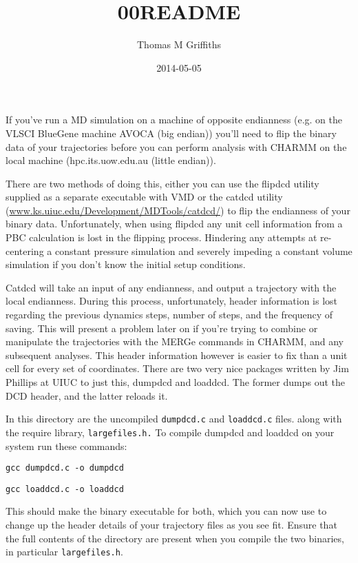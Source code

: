 \documentclass[11pt,a4paper]{article}
\title{00README}
\author{Thomas M Griffiths}
\date{2014-05-05}
\begin{document}
    \maketitle
    If you've run a MD simulation on a machine of opposite endianness 
    (e.g. on the VLSCI BlueGene machine AVOCA (big endian)) you'll need 
    to flip the binary data of your trajectories before you can perform
    analysis with CHARMM on the local machine (hpc.its.uow.edu.au 
    (little endian)).

    There are two methods of doing this, either you can use the flipdcd
    utility supplied as a separate executable with VMD or the catdcd 
    utility (\url{www.ks.uiuc.edu/Development/MDTools/catdcd/}) to
    flip the endianness of your binary data. Unfortunately, when using 
    flipdcd any unit cell information from a PBC calculation is lost in 
    the flipping process. Hindering any attempts at re-centering a 
    constant pressure simulation and severely impeding a constant 
    volume simulation if you don't know the initial setup conditions.

    Catdcd will take an input of any endianness, and output a 
    trajectory with the local endianness. During this process, 
    unfortunately, header information is lost regarding the previous 
    dynamics steps, number of steps, and the frequency of saving. 
    This will present a problem later on if you're trying to combine or
    manipulate the trajectories with the MERGe commands in CHARMM, and 
    any subsequent analyses. This header information however is easier 
    to fix than a unit cell for every set of coordinates. There are two 
    very nice packages written by Jim Phillips at UIUC to just this, 
    dumpdcd and loaddcd. The former dumps out the DCD header, and the 
    latter reloads it. 

    In this directory are the uncompiled \texttt{dumpdcd.c} and \texttt{loaddcd.c} 
    files. along with the require library, \texttt{largefiles.h.} To compile 
    dumpdcd and loaddcd on your system run these commands:

    \texttt{gcc dumpdcd.c -o dumpdcd}

    \texttt{gcc loaddcd.c -o loaddcd}
    
    This should make the binary executable for both, which you can now 
    use to change up the header details of your trajectory files as you 
    see fit. Ensure that the full contents of the directory are present 
    when you compile the two binaries, in particular \texttt{largefiles.h}.
\end{document}
